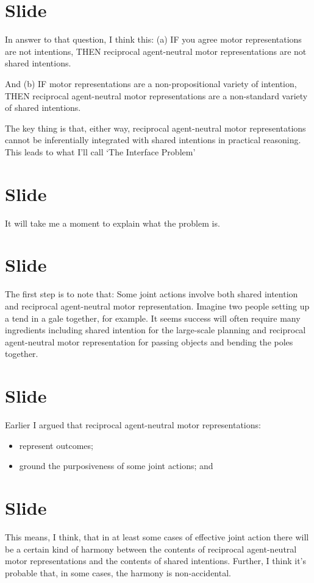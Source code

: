 \documentclass[12pt,\papersize]{extarticle}
\begin{document}
\section{Slide}
In answer to that question, I think this:
(a)
IF you agree motor representations are not intentions,
THEN reciprocal agent-neutral motor representations are not shared intentions.

And
(b)
IF motor representations are a non-propositional variety of intention,
THEN reciprocal agent-neutral motor representations are a non-standard variety of shared intentions.

The key thing is that, either way, reciprocal agent-neutral motor representations cannot be inferentially integrated with shared intentions in practical reasoning.
This leads to what I’ll call ‘The Interface Problem’


\section{Slide}
It will take me a moment to explain what the problem is.


\section{Slide}
The first step is to note that:
Some joint actions involve both shared  intention and reciprocal agent-neutral motor representation.
Imagine two people setting up a tend in a gale together, for example.
It seems success will often require many ingredients including shared intention for the large-scale planning and reciprocal agent-neutral motor representation for passing objects and bending the poles together.



\section{Slide}
Earlier I argued that reciprocal agent-neutral motor representations:

\begin{itemize}
\item represent outcomes;

\item ground the purposiveness of some 
joint actions; and
\end{itemize}


\section{Slide}
This means, I think, that in at least some cases of effective joint action there will be a certain kind of harmony between the contents of 
 reciprocal agent-neutral motor representations
 and the contents of 
 shared intentions.
Further, I think it's probable that, in some cases, the harmony is non-accidental.
 
\end{document}
